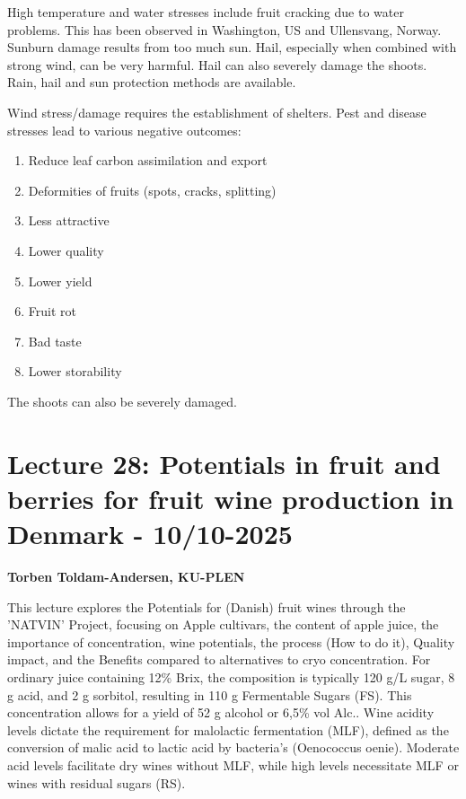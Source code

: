 \vspace{0.5em}
High temperature and water stresses include fruit cracking due to water problems. This has been observed in Washington, US and Ullensvang, Norway. Sunburn damage results from too much sun. Hail, especially when combined with strong wind, can be very harmful. Hail can also severely damage the shoots. Rain, hail and sun protection methods are available.

\vspace{0.5em}
Wind stress/damage requires the establishment of shelters. Pest and disease stresses lead to various negative outcomes: 

\begin{enumerate} 
    \item Reduce leaf carbon assimilation and export 
    \item Deformities of fruits (spots, cracks, splitting) 
    \item Less attractive 
    \item Lower quality 
    \item Lower yield 
    \item Fruit rot 
    \item Bad taste 
    \item Lower storability 
\end{enumerate} 

\vspace{0.5em}
The shoots can also be severely damaged.


\section{Lecture 28: Potentials in fruit and berries for fruit wine production in Denmark - 10/10-2025}
\textbf{Torben Toldam-Andersen, KU-PLEN}

\vspace{1em}
This lecture explores the Potentials for (Danish) fruit wines through the 'NATVIN' Project, focusing on Apple cultivars, the content of apple juice, the importance of concentration, wine potentials, the process (How to do it), Quality impact, and the Benefits compared to alternatives to cryo concentration. For ordinary juice containing 12\% Brix, the composition is typically 120 g/L sugar, 8 g acid, and 2 g sorbitol, resulting in 110 g Fermentable Sugars (FS). This concentration allows for a yield of 52 g alcohol or 6,5\% vol Alc.. Wine acidity levels dictate the requirement for malolactic fermentation (MLF), defined as the conversion of malic acid to lactic acid by bacteria's (Oenococcus oenie). Moderate acid levels facilitate dry wines without MLF, while high levels necessitate MLF or wines with residual sugars (RS).

